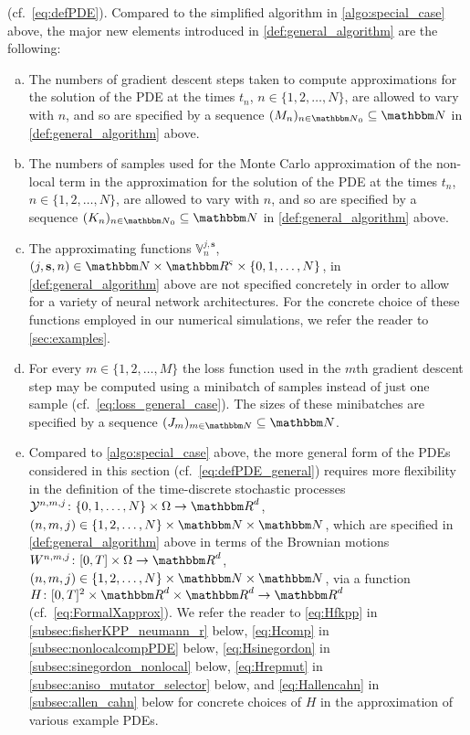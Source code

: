 %
(cf.\ \eqref{eq:defPDE}).
%
Compared to the simplified algorithm in \cref{algo:special_case} above, the major new elements introduced in \cref{def:general_algorithm} are the following:
\begin{enumerate}[(a)]
	\item The numbers of gradient descent steps taken to compute approximations for the solution of the PDE at the times $t_n$, $n\in\{1,2,\dots,N\}$, are allowed to vary with $n$, and so are specified by a sequence $(M_n)_{n\in\N_0}\subseteq\N$ in \cref{def:general_algorithm} above.
	\item The numbers of samples used for the Monte Carlo approximation of the non-local term in the approximation for the solution of the PDE at the times $t_n$, $n\in\{1,2,\dots,\allowbreak N\}$, are allowed to vary with $n$, and so are specified by a sequence $(K_n)_{n\in\N_0}\subseteq\N$ in \cref{def:general_algorithm} above.
	\item The approximating functions $\mathbb V^{j,\mathbf s}_n$, $(j,\mathbf s,n)\in \N\times\R^\varsigma\times\{0,1,\dots,N\}$, in \cref{def:general_algorithm} above are not specified concretely in order to allow for a variety of neural network architectures. For the concrete choice of these functions employed in our numerical simulations, we refer the reader to \cref{sec:examples}.
	\item For every $m\in\{1,2,\dots,M\}$ the loss function used in the $m$th gradient descent step may be computed using a minibatch of samples instead of just one sample (cf.~\cref{eq:loss_general_case}). The sizes of these minibatches are specified by a sequence $(J_m)_{m\in\N}\subseteq\N$.
	\item Compared to \cref{algo:special_case} above, the more general form of the PDEs considered in this section (cf.~\cref{eq:defPDE_general}) requires more flexibility in the definition of the time-discrete stochastic processes $\mathcal Y^{n,m,j}\colon \{0,1,\dots,N\}\times\Omega\to\R^d$, $(n,m,j)\in\{1,2,\dots,N\}\times\N\times\N$, which are specified in \cref{def:general_algorithm} above in terms of the Brownian motions $W^{n,m,j}\colon[0,T]\times\Omega\to\R^d$, $(n,m,j)\in\{1,2,\dots,N\}\times\N\times\N$, via a function $H\colon [0,T]^2\times\R^d\times\R^d\to\R^d$ (cf.~\cref{eq:FormalXapprox}). We refer the reader to \cref{eq:Hfkpp} in \cref{subsec:fisherKPP_neumann_r} below, \cref{eq:Hcomp} in \cref{subsec:nonlocalcompPDE} below, \cref{eq:Hsinegordon} in \cref{subsec:sinegordon_nonlocal} below, \cref{eq:Hrepmut} in \cref{subsec:aniso_mutator_selector} below, and \cref{eq:Hallencahn} in \cref{subsec:allen_cahn} below for concrete choices of $H$ in the approximation of various example PDEs.

\end{enumerate}
